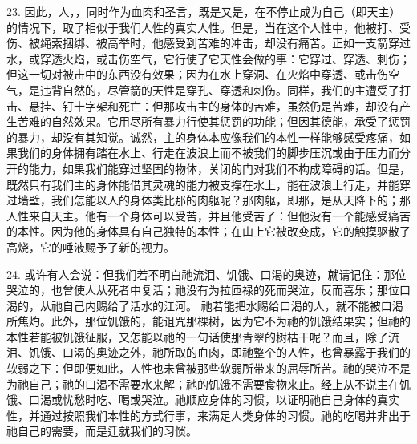 23. 因此，人，，同时作为血肉和圣言，既是又是，在不停止成为自己（即天主）的情况下，取了相似于我们人性的真实人性。但是，当在这个人性中，他被打、受伤、被绳索捆绑、被高举时，他感受到苦难的冲击，却没有痛苦。正如一支箭穿过水，或穿透火焰，或击伤空气，它行使了它天性会做的事：它穿过、穿透、刺伤；但这一切对被击中的东西没有效果；因为在水上穿洞、在火焰中穿透、或击伤空气，是违背自然的，尽管箭的天性是穿孔、穿透和刺伤。同样，我们的主遭受了打击、悬挂、钉十字架和死亡：但那攻击主的身体的苦难，虽然仍是苦难，却没有产生苦难的自然效果。它用尽所有暴力行使其惩罚的功能；但因其德能，承受了惩罚的暴力，却没有其知觉。诚然，主的身体本应像我们的本性一样能够感受疼痛，如果我们的身体拥有踏在水上、行走在波浪上而不被我们的脚步压沉或由于压力而分开的能力，如果我们能穿过坚固的物体，关闭的门对我们不构成障碍的话。但是，既然只有我们主的身体能借其灵魂的能力被支撑在水上，能在波浪上行走，并能穿过墙壁，我们怎能以人的身体类比那的肉躯呢？那肉躯，即那，是从天降下的；那人性来自天主。他有一个身体可以受苦，并且他受苦了：但他没有一个能感受痛苦的本性。因为他的身体具有自己独特的本性；在山上它被改变成，它的触摸驱散了高烧，它的唾液赐予了新的视力。\par

24. 或许有人会说：但我们若不明白祂流泪、饥饿、口渴的奥迹，就请记住：那位哭泣的，也曾使人从死者中复活；祂没有为拉匝禄的死而哭泣，反而喜乐；那位口渴的，从祂自己内赐给了活水的江河。 祂若能把水赐给口渴的人，就不能被口渴所焦灼。此外，那位饥饿的，能诅咒那棵树，因为它不为祂的饥饿结果实；但祂的本性若能被饥饿征服，又怎能以祂的一句话使那青翠的树枯干呢？而且，除了流泪、饥饿、口渴的奥迹之外，祂所取的血肉，即祂整个的人性，也曾暴露于我们的软弱之下：但即便如此，人性也未曾被那些软弱所带来的屈辱所苦。祂的哭泣不是为祂自己；祂的口渴不需要水来解；祂的饥饿不需要食物来止。经上从不说主在饥饿、口渴或忧愁时吃、喝或哭泣。祂顺应身体的习惯，以证明祂自己身体的真实性，并通过按照我们本性的方式行事，来满足人类身体的习惯。祂的吃喝并非出于祂自己的需要，而是迁就我们的习惯。\par

